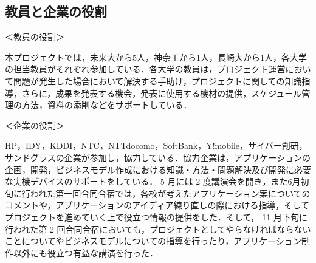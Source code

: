 \subsection{教員と企業の役割}
\par ＜教員の役割＞
\par 本プロジェクトでは，未来大から5人，神奈工から1人，長崎大から1人，各大学の担当教員がそれぞれ参加している．各大学の教員は，プロジェクト運営において問題が発生した場合において解決する手助け，プロジェクトに関しての知識指導，さらに，成果を発表する機会，発表に使用する機材の提供，スケジュール管理の方法，資料の添削などをサポートしている．

\par ＜企業の役割＞
\par
HP，IDY，KDDI，NTC，NTTdocomo，SoftBank，Y!mobile，サイバー創研，サンドグラスの企業が参加し，協力している．協力企業は，アプリケーションの企画，開発，ビジネスモデル作成における知識・方法・問題解決及び開発に必要な実機デバイスのサポートをしている． 5 月には 2 度講演会を開き，また6月初旬に行われた第一回合同合宿では，各校が考えたアプリケーション案についてのコメントや，アプリケーションのアイディア練り直しの際における指導，そしてプロジェクトを進めていく上で役立つ情報の提供をした．そして， 11 月下旬に行われた第 2 回合同合宿においても，プロジェクトとしてやらなければならないことについてやビジネスモデルについての指導を行ったり，アプリケーション制作以外にも役立つ有益な講演を行った．
